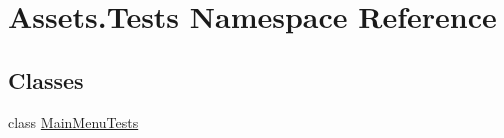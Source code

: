 \hypertarget{namespaceAssets_1_1Tests}{}\section{Assets.\+Tests Namespace Reference}
\label{namespaceAssets_1_1Tests}
\subsection*{Classes}
\begin{DoxyCompactItemize}
\item 
class \hyperlink{classAssets_1_1Tests_1_1MainMenuTests}{Main\+Menu\+Tests}
\end{DoxyCompactItemize}

